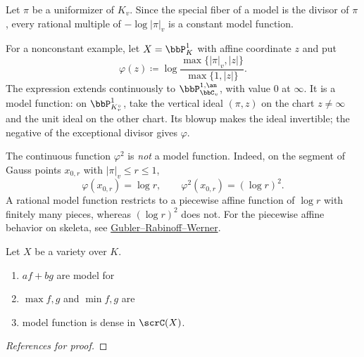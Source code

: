\begin{example}[label=\labelNFM{eg:model-function}, status=draft, tag=0000000]
	\begin{latexmathchange}
		Let $\pi$ be a uniformizer of $K_v$.
		Since the special fiber of a model is the divisor of $\pi$, every rational multiple of $-\log|\pi|_v$ is a constant model function.

		For a nonconstant example, let $X = \bbP^1_K$ with affine coordinate $z$ and put
		\[ \varphi(z) \coloneqq \log\frac{\max\{|\pi|_v,|z|\}}{\max\{1,|z|\}}. \]
		The expression extends continuously to $\bbP^{1,\an}_{\bbC_v}$, with value $0$ at $\infty$.
		It is a model function: on $\bbP^1_{K_v^\circ}$, take the vertical ideal $(\pi,z)$ on the chart $z \neq \infty$ and the unit ideal on the other chart.
		Its blowup makes the ideal invertible; the negative of the exceptional divisor gives $\varphi$.

		The continuous function $\varphi^2$ is \emph{not} a model function.
		Indeed, on the segment of Gauss points $x_{0,r}$ with $|\pi|_v \leq r \leq 1$,
		\[ \varphi(x_{0,r}) = \log r, \qquad \varphi^2(x_{0,r}) = (\log r)^2. \]
		A rational model function restricts to a piecewise affine function of $\log r$ with finitely many pieces,
		whereas $(\log r)^2$ does not.
		For the piecewise affine behavior on skeleta, see \href{https://gubler.app.uni-regensburg.de/Publikationen/1404.7044v1.pdf}{Gubler--Rabinoff--Werner}.
	\end{latexmathchange}
\end{example}

\begin{proposition}[label=\labelNFM{prop:basic-properties-of-model-function}, status=draft, tag=0000000]
	Let $X$ be a variety over $K$.
	\begin{enumerate}
		\item $af+bg$ are model for \Yang{}
		\item $\max{f,g}$ and $\min{f,g}$ are \Yang{}
		\item model function is dense in $\scrC(X)$.
	\end{enumerate}
\end{proposition}
\begin{proof}[References for proof]
	\Yang{}
\end{proof}

